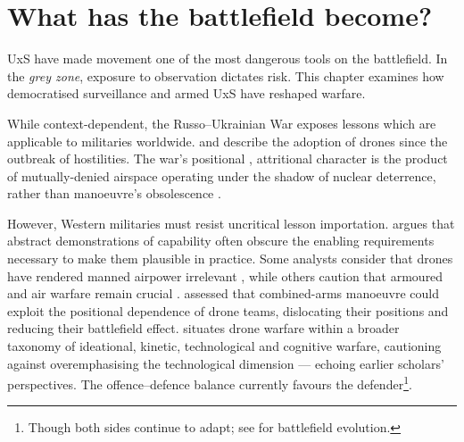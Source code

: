 \chapter{What has the battlefield become?}

UxS have made movement one of the most dangerous tools on the battlefield. In the \textit{grey zone}, exposure to observation dictates risk. This chapter examines how democratised surveillance and armed UxS have reshaped warfare.

While context-dependent, the Russo--Ukrainian War exposes lessons which are applicable to militaries worldwide. \textcite[9--13]{MOLLOY_2024} and \textcite[62--63]{ZABRODSKYI_2022} describe the adoption of drones since the outbreak of hostilities. The war's positional \parencite{watling_2024_panel}, attritional \parencite{JONES_2023,WATLING_2023A,WATLING_2023B,WATLING_2025B,WATLING_2025n,ZABRODSKYI_2022} character is the product of mutually-denied airspace operating under the shadow of nuclear deterrence, rather than manoeuvre's obsolescence \parencite[5:20--10:20]{BRONK_2022a} \parencite[25:00--27:00]{WATLING_2022C} \parencite[22--23,~31]{hvizda_2025}. 

However, Western militaries must resist uncritical lesson importation. \textcite[1--2]{Watling_book} argues that abstract demonstrations of capability often obscure the enabling requirements necessary to make them plausible in practice. Some analysts consider that drones have rendered manned airpower irrelevant \parencite{BARNO_2024}, while others caution that armoured and air warfare remain crucial \parencite{barrie_2021,BRONK_2025,SHAIKH_2020}. \textcite{stu_lyle_participant_11} assessed that combined-arms manoeuvre could exploit the positional dependence of drone teams, dislocating their positions and reducing their battlefield effect. \textcite[5:00--6:00]{CORNISH_2024} situates drone warfare within a broader taxonomy of ideational, kinetic, technological and cognitive warfare, cautioning against overemphasising the technological dimension --- echoing earlier scholars' perspectives. The offence--defence balance currently favours the defender\footnote{Though both sides continue to adapt; see \textcite{JONES_2023} for battlefield evolution.}.


